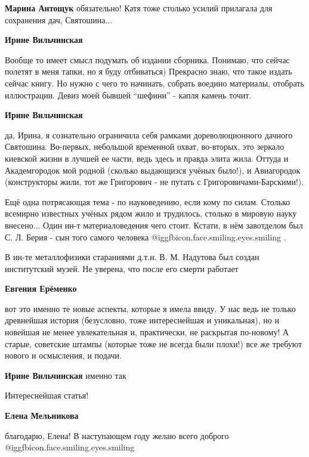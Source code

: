 \begin{itemize}
\begin{itemize}
\begin{itemize}
\textbf{Марина Антощук} обязательно! Катя тоже столько усилий прилагала для сохранения дач, Святошина...

\textbf{Ирине Вильчинская} 

Вообще то имеет смысл подумать об издании сборника. Понимаю, что сейчас полетят
в меня тапки, но я буду отбиваться) Прекрасно знаю, что такое издать сейчас
книгу. Но нужно с чего то начинать, собрать воедино материалы, отобрать
иллюстрации. Девиз моей бывшей \enquote{шефини} - капля камень точит.

\textbf{Ирине Вильчинская} 

да, Ирина, я сознательно ограничила себя рамками дореволюционного дачного
Святошина. Во-первых, небольшой временной охват, во-вторых, это зеркало
киевской жизни в лучшей ее части, ведь здесь и правда элита жила. Оттуда и
Академгородок мой родной (сколько выдающизся учёных было!), и Авиагородок
(конструкторы жили, тот же Григорович - не путать с Григоровичами-Барскими!).

Ещё одна потрясающая тема - по науковедению, если кому по силам. Столько
всемирно известных учёных рядом жило и трудилось, столько в мировую науку
внесено... Один ин-т материаловедения чего стоит. Кстати, в нём завотделом был
С. Л. Берия - сын того самого человека  @igg{fbicon.face.smiling.eyes.smiling} .

В ин-те металлофизики стараниями д.т.н. В. М. Надутова был создан институтский
музей. Не уверена, что после его смерти работает


\textbf{Евгения Ерёменко} 

вот это именно те новые аспекты, которые я имела ввиду. У нас ведь не только
древнейшая история (безусловно, тоже интереснейшая и уникальная), но и новейшая
не менее увлекательная и, практически, не раскрытая по-новому! А старые,
советские штампы (которые тоже не всегда были плохи!) все же требуют нового и
осмысления, и подачи.


\textbf{Ирине Вильчинская} именно так

\end{itemize} %

\end{itemize} %

Интереснейшая статья!

\textbf{Елена Мельникова} 

благодарю, Елена! В наступающем году желаю всего доброго
@igg{fbicon.face.smiling.eyes.smiling} 

\end{itemize} %
